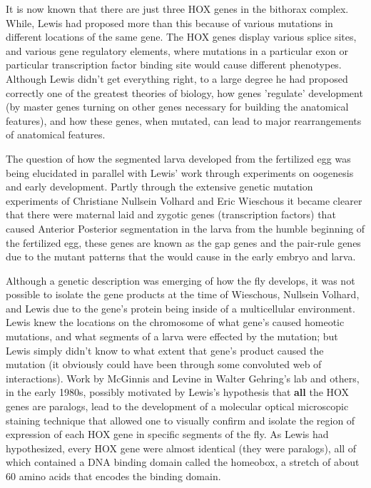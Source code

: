 It is now known that there are just three HOX genes in the bithorax complex.  While, Lewis had proposed more than this because of various mutations in different locations of the same gene.  The HOX genes display various splice sites, and various gene regulatory elements, where mutations in a particular exon or particular transcription factor binding site would cause different phenotypes.  Although Lewis didn't get everything right, to a large degree he had proposed correctly one of the greatest theories of biology, how genes 'regulate' development (by master genes turning on other genes necessary for building the anatomical features), and how these genes, when mutated, can lead to major rearrangements of anatomical features. 

The question of how the segmented larva developed from the fertilized egg was being elucidated in parallel with Lewis' work through experiments on oogenesis and early development.  Partly through the extensive genetic mutation experiments of Christiane Nullsein Volhard and Eric Wieschous it became clearer that there were maternal laid and zygotic genes (transcription factors) that caused Anterior Posterior segmentation in the larva from the humble beginning of the fertilized egg, these genes are known as the gap genes and the pair-rule genes due to the mutant patterns that the would cause in the early embryo and larva.  

Although a genetic description was emerging of how the fly develops, it was not possible to isolate the gene products at the time of Wieschous, Nullsein Volhard, and Lewis due to the gene's protein being inside of a multicellular environment.  Lewis knew the locations on the chromosome of what gene's caused homeotic mutations, and what segments of a larva were effected by the mutation; but Lewis simply didn't know to what extent that gene's product caused the mutation (it obviously could have been through some convoluted web of interactions).  Work by McGinnis and Levine in Walter Gehring's lab and others, in the early 1980s, possibly motivated by Lewis's hypothesis that \textbf{all} the HOX genes are paralogs, lead to the development of a molecular optical microscopic staining technique that allowed one to visually confirm and isolate the region of expression of each HOX gene in specific segments of the fly.  As Lewis had hypothesized, every HOX gene were almost identical (they were paralogs), all of which contained a DNA binding domain called the homeobox, a stretch of about 60 amino acids that encodes the binding domain.

